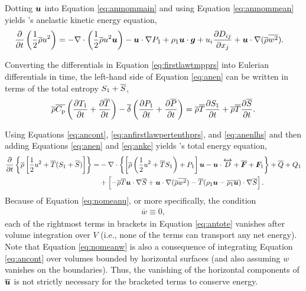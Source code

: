 \documentclass[12pt]{article}
\newcommand{\vecf}{\bm{F}}
\begin{document}
  
Dotting $\bm{u}$ into Equation \eqref{eq:anmommain} and using Equation \eqref{eq:anmommean} yields \citet{Gough1969}'s anelastic kinetic energy equation,
	\begin{align}\label{eq:anke}
		\frac{\partial}{\partial t}\left(\frac{1}{2}\overline{\rho} u^2\right)&=-\nabla\cdot\left(\frac{1}{2}\overline{\rho} u^2\bm{u} \right) - \bm{u}\cdot\nabla P_1 + \rho_1\bm{u}\cdot\bm{g} + u_i\frac{\partial D_{ij}}{\partial x_j} + \bm{u}\cdot\nabla(\overline{\rho} \overline{w^2}).
	\end{align}

Converting the differentials in Equation \eqref{eq:firstlawtmpprs} into Eulerian differentials in time, the left-hand side of Equation \eqref{eq:anen} can be written in terms of the total entropy $S_1 + \overline{S}$, 
\begin{align}\label{eq:anenlhs}
	\overline{\rho}\overline{C_{\rm{p}}}\left(\frac{\partial T_1}{\partial t}+\frac{\partial\overline{T}}{\partial t}\right)- \overline{\delta}\left(\frac{\partial P_1}{\partial t} + \frac{\partial\overline{P}}{\partial t}\right) = \overline{\rho}\overline{T}\frac{\partial S_1}{\partial t} +  \overline{\rho}\overline{T}\frac{\partial\overline{S}}{\partial t}.
\end{align}

Using Equations \eqref{eq:ancont}, \eqref{eq:anfirstlawpertenthprs}, and \eqref{eq:anenlhs} and then adding Equations \eqref{eq:anen} and \eqref{eq:anke} yields \citet{Gough1969}'s total energy equation,
\begin{align}\label{eq:antote}
			\pderiv{}{t}\left\{\rhoover\left[\frac{1}{2} u^2 + \tmpover (\entrone+\entrover)\right]\right\} = &-\Div\left\{\left[\rhoover\left(\frac{1}{2} u^2 + \tmpover \entrone\right) + \prsone\right]\vecu- \vecu\cdot\overleftrightarrow{D} + \overline{\vecf} + \vecf_1\right\}+ \heatover + Q_1 \nonumber\\
			 &+\left[-\rhoover\tmpover\ugrad\entrover +\ugrad (\rhoover \overline{w^2})- \tmpover(\rhoone\vecu-\overline{\rhoone\vecu})\cdot\nabla\entrover\right].
\end{align}
Because of Equation \eqref{eq:nomeanu}, or more specifically, the condition
\begin{align}\label{eq:nomeanw}
	\overline{w}\equiv0,
\end{align}
 each of the rightmost terms in brackets in Equation \eqref{eq:antote} vanishes after volume integration over $V$ (i.e., none of the terms can transport any net energy). Note that Equation \eqref{eq:nomeanw} is also a consequence of integrating Equation \eqref{eq:ancont} over volumes bounded by horizontal surfaces (and also assuming $w$ vanishes on the boundaries). Thus, the vanishing of the horizontal components of $\overline{\bm{u}}$ is not strictly necessary for the bracketed terms to conserve energy. 
 
\end{document}
